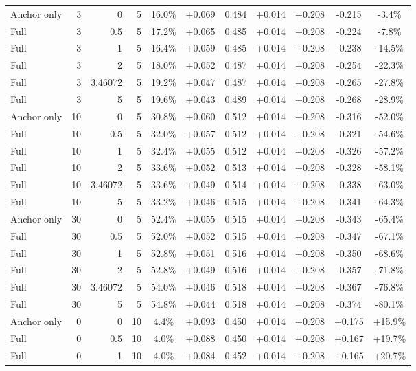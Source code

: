 \begin{table}[htbp]
\begin{tabular}{lrrrccccccc}
Anchor only & 3 & 0 & 5 & 16.0\% & +0.069 & 0.484 & +0.014 & +0.208 & -0.215 & -3.4\% \\
Full & 3 & 0.5 & 5 & 17.2\% & +0.065 & 0.485 & +0.014 & +0.208 & -0.224 & -7.8\% \\
Full & 3 & 1 & 5 & 16.4\% & +0.059 & 0.485 & +0.014 & +0.208 & -0.238 & -14.5\% \\
Full & 3 & 2 & 5 & 18.0\% & +0.052 & 0.487 & +0.014 & +0.208 & -0.254 & -22.3\% \\
Full & 3 & 3.46072 & 5 & 19.2\% & +0.047 & 0.487 & +0.014 & +0.208 & -0.265 & -27.8\% \\
Full & 3 & 5 & 5 & 19.6\% & +0.043 & 0.489 & +0.014 & +0.208 & -0.268 & -28.9\% \\
Anchor only & 10 & 0 & 5 & 30.8\% & +0.060 & 0.512 & +0.014 & +0.208 & -0.316 & -52.0\% \\
Full & 10 & 0.5 & 5 & 32.0\% & +0.057 & 0.512 & +0.014 & +0.208 & -0.321 & -54.6\% \\
Full & 10 & 1 & 5 & 32.4\% & +0.055 & 0.512 & +0.014 & +0.208 & -0.326 & -57.2\% \\
Full & 10 & 2 & 5 & 33.6\% & +0.052 & 0.513 & +0.014 & +0.208 & -0.328 & -58.1\% \\
Full & 10 & 3.46072 & 5 & 33.6\% & +0.049 & 0.514 & +0.014 & +0.208 & -0.338 & -63.0\% \\
Full & 10 & 5 & 5 & 33.2\% & +0.046 & 0.515 & +0.014 & +0.208 & -0.341 & -64.3\% \\
Anchor only & 30 & 0 & 5 & 52.4\% & +0.055 & 0.515 & +0.014 & +0.208 & -0.343 & -65.4\% \\
Full & 30 & 0.5 & 5 & 52.0\% & +0.052 & 0.515 & +0.014 & +0.208 & -0.347 & -67.1\% \\
Full & 30 & 1 & 5 & 52.8\% & +0.051 & 0.516 & +0.014 & +0.208 & -0.350 & -68.6\% \\
Full & 30 & 2 & 5 & 52.8\% & +0.049 & 0.516 & +0.014 & +0.208 & -0.357 & -71.8\% \\
Full & 30 & 3.46072 & 5 & 54.0\% & +0.046 & 0.518 & +0.014 & +0.208 & -0.367 & -76.8\% \\
Full & 30 & 5 & 5 & 54.8\% & +0.044 & 0.518 & +0.014 & +0.208 & -0.374 & -80.1\% \\
Anchor only & 0 & 0 & 10 & 4.4\% & +0.093 & 0.450 & +0.014 & +0.208 & +0.175 & +15.9\% \\
Full & 0 & 0.5 & 10 & 4.0\% & +0.088 & 0.450 & +0.014 & +0.208 & +0.167 & +19.7\% \\
Full & 0 & 1 & 10 & 4.0\% & +0.084 & 0.452 & +0.014 & +0.208 & +0.165 & +20.7\% \\

\end{tabular}
\end{table}

